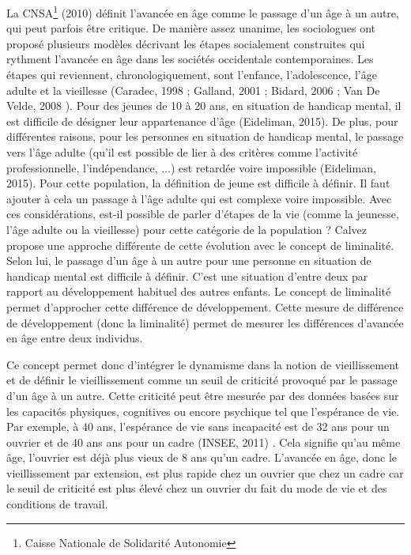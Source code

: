 La CNSA\footnote{Caisse Nationale de Solidarité Autonomie} (2010) \cite{CNSA2010} définit l'avancée en âge comme le passage d'un âge à un autre, qui peut parfois être critique. 
De manière assez unanime, les sociologues ont proposé plusieurs modèles décrivant les étapes socialement construites qui rythment l'avancée en âge dans les sociétés occidentale contemporaines. Les étapes qui reviennent, chronologiquement, sont l'enfance, l'adolescence, l'âge adulte et la vieillesse (Caradec, 1998 \cite{Caradec1998}; Galland, 2001 \cite{Galland2001}; Bidard, 2006 \cite{Bidard2006}; Van De Velde, 2008 \cite{VanDeVelde2008}). Pour des jeunes de 10 à 20 ans, en situation de handicap mental, il est difficile de désigner leur appartenance d'âge (Eideliman, 2015). De plus, pour différentes raisons, pour les personnes en situation de handicap mental, le passage vers l'âge adulte (qu'il est possible de lier à des critères comme l'activité professionnelle, l'indépendance, ...) est retardée voire impossible (Eideliman, 2015). Pour cette population, la définition de jeune est difficile à définir. Il faut ajouter à cela un passage à l'âge adulte qui est  complexe voire impossible. Avec ces considérations, est-il possible de parler d'étapes de la vie (comme la jeunesse, l'âge adulte ou la vieillesse) pour cette catégorie de la population ? Calvez propose une approche différente de cette évolution avec le concept de liminalité. Selon lui, le passage d'un âge à un autre pour une personne en situation de handicap mental est difficile à définir. C'est une situation d'entre deux par rapport au développement habituel des autres enfants. Le concept de liminalité permet d'approcher cette différence de développement. Cette mesure de différence de développement (donc la liminalité) permet de mesurer les différences d'avancée en âge entre deux individus. 


Ce concept permet donc d'intégrer le dynamisme dans la notion de vieillissement et de définir le vieillissement comme un seuil de criticité provoqué par le passage d'un âge à un autre. Cette criticité peut être mesurée par des données basées sur les capacités physiques, cognitives ou encore psychique tel que l'espérance de vie. Par exemple, à 40 ans, l'espérance de vie sans incapacité est de 32 ans pour un ouvrier et de 40 ans ans pour un cadre (INSEE, 2011) \cite{INSEE2011}. Cela signifie qu'au même âge, l'ouvrier est déjà plus vieux de 8 ans qu'un cadre. L'avancée en âge, donc le vieillissement par extension, est plus rapide chez un ouvrier que chez un cadre car le seuil de criticité est plus élevé chez un ouvrier du fait du mode de vie et des conditions de travail. 

